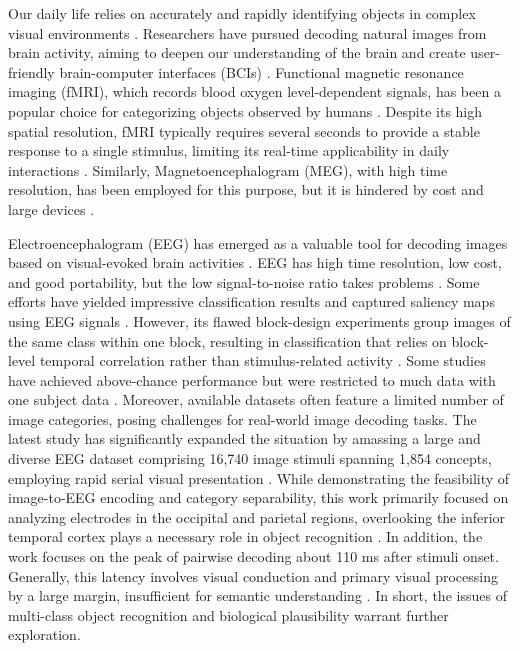 \label{sec:introduction}
Our daily life relies on accurately and rapidly identifying objects in complex visual environments \citep{dicarlo2007untangling}.  
Researchers have pursued decoding natural images from brain activity, aiming to deepen our understanding of the brain and create user-friendly brain-computer interfaces (BCIs) \citep{kamitani2005decoding, kay2008identifying, gao2021interfacea}. 
Functional magnetic resonance imaging (fMRI), which records blood oxygen level-dependent signals, has been a popular choice for categorizing objects observed by humans \citep{du2023decoding, horikawa2017generic, allen2022massive}.
Despite its high spatial resolution, fMRI typically requires several seconds to provide a stable response to a single stimulus, limiting its real-time applicability in daily interactions \citep{NEURIPS2022_bee5125b}.
Similarly, Magnetoencephalogram (MEG), with high time resolution, has been employed for this purpose, but it is hindered by cost and large devices \citep{cichy2014resolving, hebart2023thingsdata}.

Electroencephalogram (EEG) has emerged as a valuable tool for decoding images based on visual-evoked brain activities \citep{spampinato2017deep}. 
EEG has high time resolution, low cost, and good portability, but the low signal-to-noise ratio takes problems \citep{pan2022matt, kobler2022spd}. 
Some efforts have yielded impressive classification results and captured saliency maps using EEG signals \citep{palazzo2021decoding}.
However, its flawed block-design experiments group images of the same class within one block, resulting in classification that relies on block-level temporal correlation rather than stimulus-related activity \citep{li2021perils}.
Some studies have achieved above-chance performance but were restricted to much data with one subject data \citep{ahmed2021object}.
Moreover, available datasets often feature a limited number of image categories, posing challenges for real-world image decoding tasks.
The latest study has significantly expanded the situation by amassing a large and diverse EEG dataset comprising 16,740 image stimuli spanning 1,854 concepts, employing rapid serial visual presentation \citep{gifford2022large}.  
While demonstrating the feasibility of image-to-EEG encoding and category separability, this work primarily focused on analyzing electrodes in the occipital and parietal regions, overlooking the inferior temporal cortex plays a necessary role in object recognition \citep{dapello2023aligning}.
In addition, the work focuses on the peak of pairwise decoding about 110 ms after stimuli onset. 
Generally, this latency involves visual conduction and primary visual processing by a large margin, insufficient for semantic understanding \cite{xu2023temporal}.
In short, the issues of multi-class object recognition and biological plausibility warrant further exploration.

